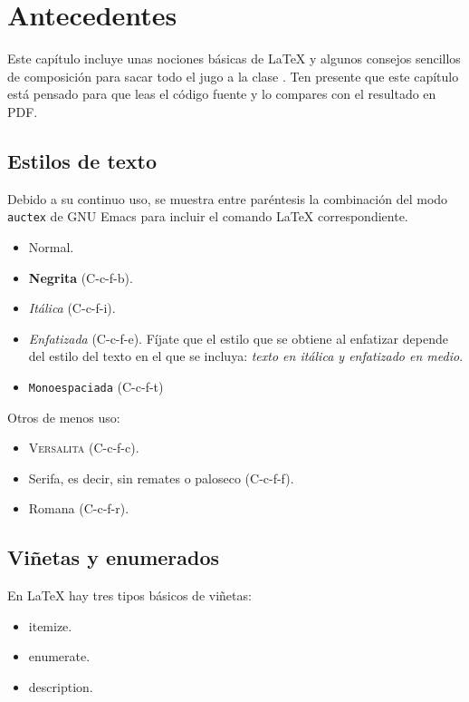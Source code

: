 \chapter{Antecedentes}
\label{chap:antecedentes}

Este capítulo incluye unas nociones básicas de \LaTeX{} y algunos consejos
sencillos de composición para sacar todo el jugo a la clase \arcopfc. Ten
presente que este capítulo está pensado para que leas el código fuente y lo
compares con el resultado en PDF.

\section{Estilos de texto}

Debido a su continuo uso, se muestra entre paréntesis la combinación del modo
\texttt{auctex} de GNU Emacs para incluir el comando \LaTeX{} correspondiente.

\begin{itemize}
\item Normal.
\item \textbf{Negrita} (C-c-f-b).
\item \textit{Itálica} (C-c-f-i).
\item \emph{Enfatizada} (C-c-f-e). Fíjate que el estilo que se obtiene al
  enfatizar depende del estilo del texto en el que se incluya: \textit{texto en
    itálica y \emph{enfatizado} en medio}.
\item \texttt{Monoespaciada} (C-c-f-t)
\end{itemize}

Otros de menos uso:

\begin{itemize}
\item \textsc{Versalita} (C-c-f-c).
\item \textsf{Serifa}, es decir, sin remates o paloseco (C-c-f-f).
\item \textrm{Romana} (C-c-f-r).
\end{itemize}


\section{Viñetas y enumerados}

En \LaTeX{} hay tres tipos básicos de viñetas:

\begin{itemize}
\item itemize.
\item enumerate.
\item description.
\end{itemize}



